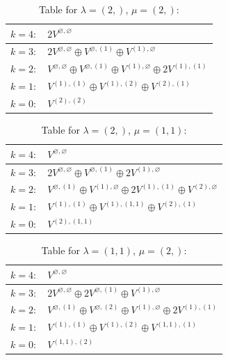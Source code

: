 \renewcommand{\arraystretch}{1.6} 
\begin{table}[H]
\centering
\caption{Table for $\lambda = (2,)$, $\mu = (2,)$:}
\begin{tabular}{|>{\centering\arraybackslash}p{15cm}|}
\hline
 $k = 4: \quad 2 V^{\varnothing, \varnothing} $ \\ \hline
 $k = 3: \quad 2 V^{\varnothing, \varnothing} \oplus V^{\varnothing, (1)} \oplus V^{(1), \varnothing} $ \\ \hline
 $k = 2: \quad V^{\varnothing, \varnothing} \oplus V^{\varnothing, (1)} \oplus V^{(1), \varnothing} \oplus 2 V^{(1), (1)} $ \\ \hline
 $k = 1: \quad V^{(1), (1)} \oplus V^{(1), (2)} \oplus V^{(2), (1)} $ \\ \hline
 $k = 0: \quad V^{(2), (2)} $ \\ \hline
\end{tabular}
\end{table}

\renewcommand{\arraystretch}{1.6} 
\begin{table}[H]
\centering
\caption{Table for $\lambda = (2,)$, $\mu = (1, 1)$:}
\begin{tabular}{|>{\centering\arraybackslash}p{15cm}|}
\hline
 $k = 4: \quad V^{\varnothing, \varnothing} $ \\ \hline
 $k = 3: \quad 2 V^{\varnothing, \varnothing} \oplus V^{\varnothing, (1)} \oplus 2 V^{(1), \varnothing} $ \\ \hline
 $k = 2: \quad V^{\varnothing, (1)} \oplus V^{(1), \varnothing} \oplus 2 V^{(1), (1)} \oplus V^{(2), \varnothing} $ \\ \hline
 $k = 1: \quad V^{(1), (1)} \oplus V^{(1), (1, 1)} \oplus V^{(2), (1)} $ \\ \hline
 $k = 0: \quad V^{(2), (1, 1)} $ \\ \hline
\end{tabular}
\end{table}

\renewcommand{\arraystretch}{1.6} 
\begin{table}[H]
\centering
\caption{Table for $\lambda = (1, 1)$, $\mu = (2,)$:}
\begin{tabular}{|>{\centering\arraybackslash}p{15cm}|}
\hline
 $k = 4: \quad V^{\varnothing, \varnothing} $ \\ \hline
 $k = 3: \quad 2 V^{\varnothing, \varnothing} \oplus 2 V^{\varnothing, (1)} \oplus V^{(1), \varnothing} $ \\ \hline
 $k = 2: \quad V^{\varnothing, (1)} \oplus V^{\varnothing, (2)} \oplus V^{(1), \varnothing} \oplus 2 V^{(1), (1)} $ \\ \hline
 $k = 1: \quad V^{(1), (1)} \oplus V^{(1), (2)} \oplus V^{(1, 1), (1)} $ \\ \hline
 $k = 0: \quad V^{(1, 1), (2)} $ \\ \hline
\end{tabular}
\end{table}

